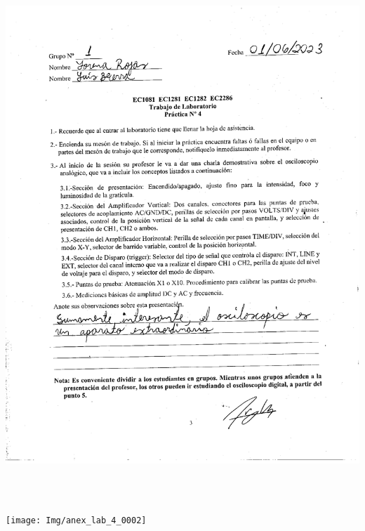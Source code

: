 \documentclass[12pt]{article}
\begin{document}
	\begin{center}
		\includegraphics[width=16cm,height=20cm]{Img/anex_lab_4_0001}
	\end{center}
	
	\begin{center}
		\texttt{[image: Img/anex\_lab\_4\_0002]}
	\end{center}
	
\end{document}

